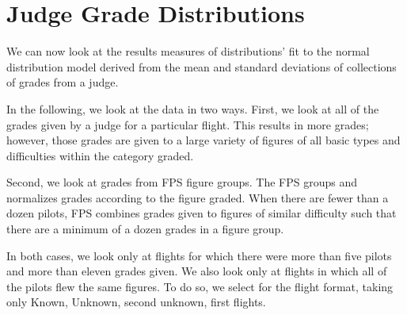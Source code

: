 \section{Judge Grade Distributions}

We can now look at the results measures of distributions'
fit to the normal distribution model derived from the mean and standard
deviations of collections of grades from a judge.

In the following, we look at the data in two ways. First, we look at all of
the grades given by a judge for a particular flight. This results in more
grades; however, those grades are given to a large variety of figures of
all basic types and difficulties within the category graded.

Second, we look at grades from FPS figure groups. The FPS groups and
normalizes grades according to the figure graded. When there are fewer than
a dozen pilots, FPS combines grades given to figures of similar difficulty
such that there are a minimum of a dozen grades in a figure group.

In both cases, we look only at flights for
which there were more than five pilots and more than eleven grades given.
We also look only at flights in which all of the pilots flew the same figures.
To do so, we select for the flight format, taking only Known, Unknown, second
unknown, first flights.
